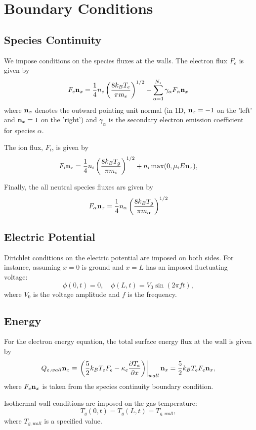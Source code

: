 \section{Boundary Conditions} \label{sec:fluid-bcs}

\subsection{Species Continuity}
We impose conditions on the species fluxes at the walls.  The electron
flux $F_e$ is given by
%
\begin{equation*}
F_e \mathbf{n}_x
=
\frac{1}{4} n_e \left( \frac{8 k_B T_e}{\pi m_e} \right)^{1/2}
-
\sum_{\alpha=1}^{N_s} \gamma_{\alpha} F_{\alpha} \mathbf{n}_x
\end{equation*}
%
where $\mathbf{n}_x$ denotes the outward pointing unit normal (in 1D,
$\mathbf{n}_x =-1$ on the 'left' and $\mathbf{n}_x = 1$ on the 'right') and
$\gamma_{\alpha}$ is the secondary electron emission coefficient for
species $\alpha$.  

The ion flux, $F_i$, is given by
%
\begin{equation*}
F_i \mathbf{n}_x
=
\frac{1}{4} n_i \left( \frac{8 k_B T_g}{\pi m_i} \right)^{1/2}
+
n_i \max(0, \mu_i E \mathbf{n}_x),
\end{equation*}
%

Finally, the all neutral species fluxes ars given by
%
\begin{equation*}
F_{\alpha} \mathbf{n}_x
=
\frac{1}{4} n_{\alpha} \left( \frac{8 k_B T_g}{\pi m_{\alpha}} \right)^{1/2}
\end{equation*}
%

\subsection{Electric Potential}
Dirichlet conditions on the electric potential are imposed on both
sides.  For instance, assuming $x=0$ is ground and $x=L$ has an
imposed fluctuating voltage:
%
\begin{equation*}
\phi(0,t) = 0, \quad \phi(L,t) = V_0 \sin(2 \pi f t),
\end{equation*}
%
where $V_0$ is the voltage amplitude and $f$ is the frequency.

\subsection{Energy}
For the electron energy equation, the total surface energy flux at the
wall is given by
%
\begin{equation*}
Q_{e,wall} \mathbf{n}_x
\equiv
\left. \left( \frac{5}{2} k_B T_e F_e - \kappa_e \frac{\partial T_e}{\partial x} \right)\right|_{wall} \mathbf{n}_x
= 
\frac{5}{2} k_B T_e F_e \mathbf{n}_x,
\end{equation*}
%
where $F_e \mathbf{n}_x$ is taken from the species continuity boundary
condition.

Isothermal wall conditions are imposed on the gas temperature:
%
\begin{equation*}
T_g(0,t) = T_g(L,t) = T_{g,wall},
\end{equation*}
%
where $T_{g,wall}$ is a specified value.
